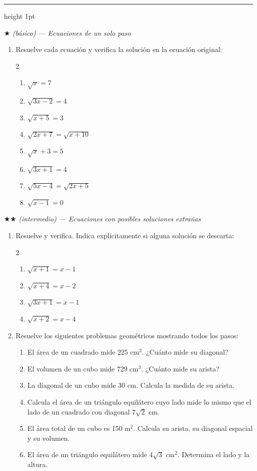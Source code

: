 \documentclass[11pt, letterpaper]{article}
\newcommand{\subbloque}[1]{%
  \vspace{14pt}
  \noindent{\large\bfseries\color{zenitnavy} #1}\par
  \vspace{4pt}\hrule height 1pt\vspace{8pt}}
\begin{document}
\clearpage
\subbloque{Ejercicios de desarrollo}

$\bigstar$ \textit{(básico) — Ecuaciones de un solo paso}

\begin{enumerate}[label=\textbf{\arabic*.}, leftmargin=*]
  \item Resuelve cada ecuación y verifica la solución en la ecuación original:
  \begin{multicols}{2}
  \begin{enumerate}[label=\alph*)]
    \item $\sqrt{x} = 7$
    \item $\sqrt{3x-2} = 4$
    \item $\sqrt{x+5} = 3$
    \item $\sqrt{2x+7} = \sqrt{x+10}$
    \item $\sqrt{x}+3 = 5$
    \item $\sqrt{3x+1} = 4$
    \item $\sqrt{5x-4} = \sqrt{2x+5}$
    \item $\sqrt{x-1} = 0$
  \end{enumerate}
  \end{multicols}
\end{enumerate}

$\bigstar\bigstar$ \textit{(intermedio) — Ecuaciones con posibles soluciones extrañas}

\begin{enumerate}[label=\textbf{\arabic*.}, leftmargin=*, resume]
  \item Resuelve y verifica. Indica explícitamente si alguna solución se descarta:
  \begin{multicols}{2}
  \begin{enumerate}[label=\alph*)]
    \item $\sqrt{x+1} = x-1$
    \item $\sqrt{x+4} = x-2$
    \item $\sqrt{3x+1} = x-1$
    \item $\sqrt{x+2} = x-4$
  \end{enumerate}
  \end{multicols}

  \item Resuelve los siguientes problemas geométricos mostrando todos los pasos:
  \begin{enumerate}[label=\alph*)]
    \item El área de un cuadrado mide 225 cm$^2$. ¿Cuánto mide su diagonal?
    \item El volumen de un cubo mide 729 cm$^3$. ¿Cuánto mide su arista?
    \item La diagonal de un cubo mide 30 cm. Calcula la medida de su arista.
    \item Calcula el área de un triángulo equilátero cuyo lado mide lo mismo que el lado de un cuadrado con diagonal $7\sqrt{2}$ cm.
    \item El área total de un cubo es 150 m$^2$. Calcula su arista, su diagonal espacial y su volumen.
    \item El área de un triángulo equilátero mide $4\sqrt{3}$ cm$^2$. Determina el lado y la altura.
  \end{enumerate}
\end{enumerate}
\end{document}
